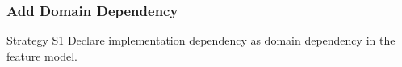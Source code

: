 %		
%		

\subsubsection*{Add Domain Dependency}
\begin{frame}{\myframetitle}
	\begin{fancycolumns}[widths={30},animation=none]
		\begin{definition}{Strategy S1}
			Declare implementation dependency as domain dependency in the feature model.
		\end{definition}
	\nextcolumn
	\end{fancycolumns}
\end{frame}



